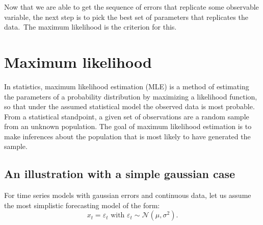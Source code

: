 \documentclass[a4paper,12pt]{article}%
\begin{document}
Now that we are able to get the sequence of errors that replicate some
observable variable, the next step is to pick the best set of parameters that
replicates the data.\ The maximum likelihood is the criterion for this.

\newpage

\section{Maximum likelihood}

In statistics, maximum likelihood estimation (MLE) is a method of estimating
the parameters of a probability distribution by maximizing a likelihood
function, so that under the assumed statistical model the observed data is
most probable. From a statistical standpoint, a given set of observations are
a random sample from an unknown population. The goal of maximum likelihood
estimation is to make inferences about the population that is most likely to
have generated the sample.

\subsection{An illustration with a simple gaussian case}

For time series models with gaussian errors and continuous data, let us assume
the most simplistic forecasting model of the form:%
\[
x_{t}=\varepsilon_{t}\text{ with }\varepsilon_{t}\sim\mathcal{N}(\mu
,\sigma^{2}).
\]
\end{document}
